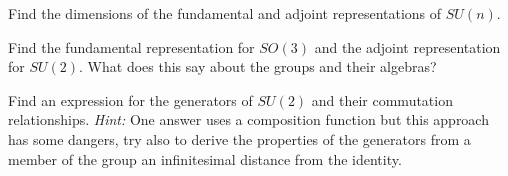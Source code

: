 \documentclass[notes.tex]{subfiles}
\begin{document}
\begin{Exercise}[]
Find the dimensions of the fundamental and adjoint representations of $SU(n)$.
\end{Exercise}

\begin{Exercise}[]
Find the fundamental representation for $SO(3)$ and the adjoint representation for $SU(2)$. What does this say about the groups and their algebras?
\end{Exercise}

\begin{Exercise}[difficulty={3}]
Find an expression for the generators of $SU(2)$ and their commutation relationships. {\it Hint:} One answer uses a composition function but this approach has some dangers, try also to derive the properties of the generators from a member of the group an infinitesimal distance from the identity.
\end{Exercise}
\end{document}
